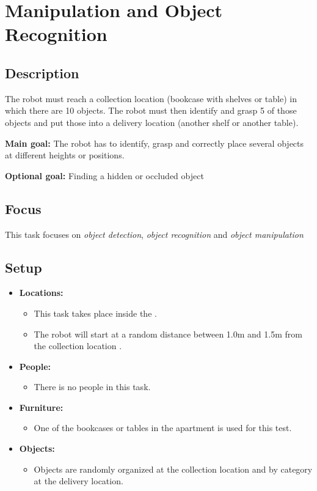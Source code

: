 \section{Manipulation and Object Recognition}
\label{test:manipulation-and-object-recognition}

\subsection*{Description}
The robot must reach a collection location (bookcase with shelves or table) in which there are 10 objects. The robot must then identify and grasp 5 of those objects and put those into a delivery location (another shelf or another table).

\noindent \textbf{Main goal:}
The robot has to identify, grasp and correctly place several objects at different heights or positions.

\noindent \textbf{Optional goal:}
Finding a hidden or occluded object

\subsection*{Focus}
This task focuses on
\textit{object detection},
\textit{object recognition} and
\textit{object manipulation}

\subsection*{Setup}
\begin{itemize}[nosep]	
	\item \textbf{Locations:} 
	\begin{itemize}
		\item This task takes place inside the \Arena{}.
		\item The robot will start at a random distance between 1.0m and 1.5m from the collection location .
	\end{itemize}	 
	\item \textbf{People:} 
	\begin{itemize}
		\item There is no people in this task.
	\end{itemize}
	\item \textbf{Furniture:} 
	\begin{itemize}
		\item One of the bookcases or tables in the apartment is used for this test.
	\end{itemize}
    \item \textbf{Objects:} 
    \begin{itemize}
		\item Objects are randomly organized at the collection location and by category at the delivery location.
	\end{itemize}
\end{itemize}

